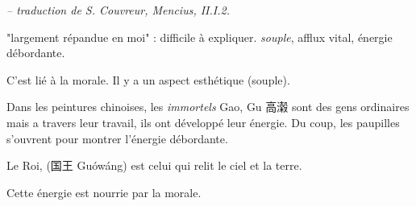 \begin{singlequote}
\textit{\small -- traduction de S. Couvreur, Mencius, II.I.2. }
\end{singlequote}

\begin{Def}[sensibilité]
    "largement répandue en moi" : difficile à expliquer. \textit{souple}, afflux vital, énergie débordante. 
\end{Def}
C'est lié à la morale. Il y a un aspect esthétique (souple). 

\begin{Ex}
    Dans les peintures chinoises, les \textit{immortels}  
Gao, Gu 高濲
 sont des gens ordinaires mais a travers leur travail, ils ont développé leur énergie. Du coup, les paupilles s'ouvrent pour montrer l'énergie débordante.
\end{Ex}

Le Roi, (国王
Guówáng) est celui qui relit le ciel et la terre. 

Cette énergie est nourrie par la morale. 


